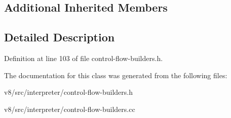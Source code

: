 \subsection*{Additional Inherited Members}


\subsection{Detailed Description}


Definition at line 103 of file control-\/flow-\/builders.\+h.



The documentation for this class was generated from the following files\+:\begin{DoxyCompactItemize}
\item 
v8/src/interpreter/control-\/flow-\/builders.\+h\item 
v8/src/interpreter/control-\/flow-\/builders.\+cc\end{DoxyCompactItemize}
